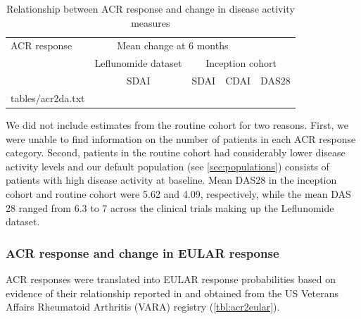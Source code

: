 \documentclass[11pt,final,fleqn]{article}\usepackage[]{graphicx}\usepackage[]{color}
\makeatletter
\theoremstyle{plain}
\newcommand*\ExpandableInput[1]{\@@input#1 }
\makeatother
\begin{document}
\begin{table}[!ht]
\begin{center}
\begin{threeparttable}
\caption{Relationship between ACR response and change in disease activity measures} \label{tbl:acr2da}
\begin{tabularx}{\textwidth}{@{\extracolsep{\fill}}lcccc}
\hline
\multicolumn{1}{l}{ACR response} &  \multicolumn{3}{c}{Mean change at 6 months}\\
\cmidrule{2-5}
\multicolumn{1}{l}{} & \multicolumn{1}{c}{Leflunomide dataset} & \multicolumn{3}{c}{Inception cohort}\\
\cmidrule(lr){2-2}  \cmidrule(lr){3-5}
\multicolumn{1}{c}{} & \multicolumn{1}{c}{SDAI} & \multicolumn{1}{c}{SDAI} &\multicolumn{1}{c}{CDAI} & \multicolumn{1}{c}{DAS28} \\
\hline
\ExpandableInput{tables/acr2da.txt}
\hline
\end{tabularx}
\scriptsize
\end{threeparttable}
\end{center}
\end{table}

We did not include estimates from the routine cohort for two reasons. First, we were unable to find information on the number of patients in each ACR response category. Second, patients in the routine cohort had considerably lower disease activity levels \citep{aletaha2005simplified, aletaha2005acute} and our default population (see \autoref{sec:populations}) consists of patients with high disease activity at baseline. Mean DAS28 in the inception cohort and routine cohort were 5.62 and 4.09, respectively, while the mean DAS 28 ranged from 6.3 to 7 across the clinical trials making up the Leflunomide dataset.

\subsubsection{ACR response and change in EULAR response}
ACR responses were translated into EULAR response probabilities based on evidence of their relationship reported in \citet{stevenson2016adalimumab} and obtained from the US Veterans Affairs Rheumatoid Arthritis (VARA) registry (\autoref{tbl:acr2eular}).
\end{document}
